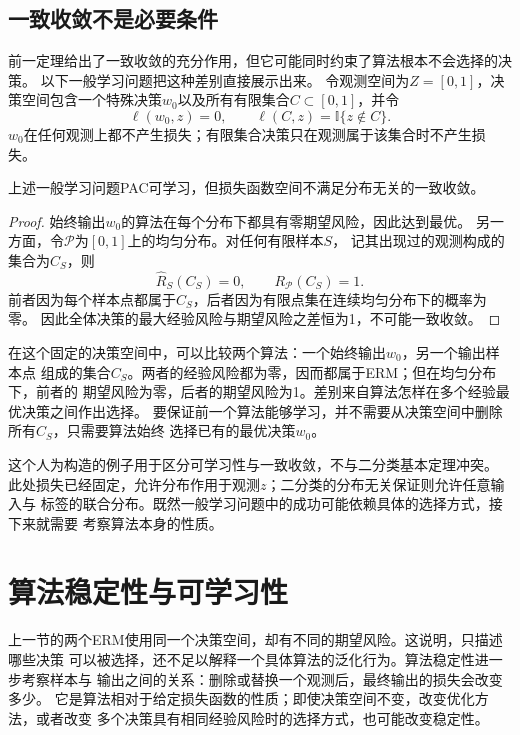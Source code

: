 \subsection{一致收敛不是必要条件}

前一定理给出了一致收敛的充分作用，但它可能同时约束了算法根本不会选择的决策。
以下一般学习问题把这种差别直接展示出来。
令观测空间为$Z=[0,1]$，决策空间包含一个特殊决策$w_0$以及所有有限集合$C\subset[0,1]$，并令
\[
 \ell(w_0,z)=0,\qquad \ell(C,z)=\mathbb I\{z\notin C\}.
\]
$w_0$在任何观测上都不产生损失；有限集合决策只在观测属于该集合时不产生损失。

\begin{theorem}[可学习性不推出一致收敛]
\label{thm:general-learning-without-uniform}
上述一般学习问题PAC可学习，但损失函数空间不满足分布无关的一致收敛。
\end{theorem}
\begin{proof}
始终输出$w_0$的算法在每个分布下都具有零期望风险，因此达到最优。
另一方面，令$\mathcal P$为$[0,1]$上的均匀分布。对任何有限样本$S$，
记其出现过的观测构成的集合为$C_S$，则
\[
 \hat R_S(C_S)=0,\qquad R_{\mathcal P}(C_S)=1.
\]
前者因为每个样本点都属于$C_S$，后者因为有限点集在连续均匀分布下的概率为零。
因此全体决策的最大经验风险与期望风险之差恒为1，不可能一致收敛。
\end{proof}

在这个固定的决策空间中，可以比较两个算法：一个始终输出$w_0$，另一个输出样本点
组成的集合$C_S$。两者的经验风险都为零，因而都属于ERM；但在均匀分布下，前者的
期望风险为零，后者的期望风险为1。差别来自算法怎样在多个经验最优决策之间作出选择。
要保证前一个算法能够学习，并不需要从决策空间中删除所有$C_S$，只需要算法始终
选择已有的最优决策$w_0$。

这个人为构造的例子用于区分可学习性与一致收敛，不与二分类基本定理冲突。
此处损失已经固定，允许分布作用于观测$z$；二分类的分布无关保证则允许任意输入与
标签的联合分布。既然一般学习问题中的成功可能依赖具体的选择方式，接下来就需要
考察算法本身的性质。

\section{算法稳定性与可学习性}
\label{sec:algorithmic-stability}

上一节的两个ERM使用同一个决策空间，却有不同的期望风险。这说明，只描述哪些决策
可以被选择，还不足以解释一个具体算法的泛化行为。算法稳定性进一步考察样本与
输出之间的关系：删除或替换一个观测后，最终输出的损失会改变多少。
它是算法相对于给定损失函数的性质；即使决策空间不变，改变优化方法，或者改变
多个决策具有相同经验风险时的选择方式，也可能改变稳定性。

